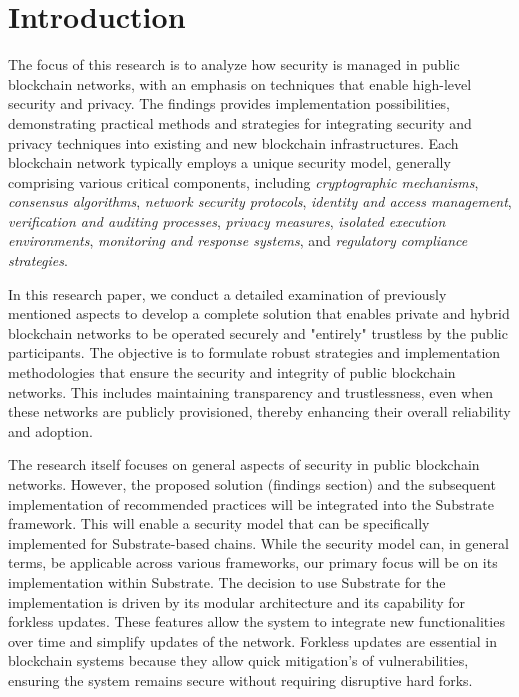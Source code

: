\section{Introduction}
The focus of this research is to analyze how security is managed in public blockchain networks, with an emphasis on techniques that enable high-level security and privacy. The findings provides implementation possibilities, demonstrating practical methods and strategies for integrating security and privacy techniques into existing and new blockchain infrastructures. Each blockchain network typically employs a unique security model, generally comprising various critical components, including \textit{cryptographic mechanisms}, \textit{consensus algorithms}, \textit{network security protocols}, \textit{identity and access management}, \textit{verification and auditing processes}, \textit{privacy measures}, \textit{isolated execution environments}, \textit{monitoring and response systems}, and \textit{regulatory compliance strategies}.

In this research paper, we conduct a detailed examination of previously mentioned aspects to develop a complete solution that enables private and hybrid blockchain networks to be operated securely and "entirely" trustless by the public participants. The objective is to formulate robust strategies and implementation methodologies that ensure the security and integrity of public blockchain networks. This includes maintaining transparency and trustlessness, even when these networks are publicly provisioned, thereby enhancing their overall reliability and adoption.

The research itself focuses on general aspects of security in public blockchain networks. However, the proposed solution (findings section) and the subsequent implementation of recommended practices will be integrated into the Substrate framework. This will enable a security model that can be specifically implemented for Substrate-based chains. While the security model can, in general terms, be applicable across various frameworks, our primary focus will be on its implementation within Substrate. The decision to use Substrate for the implementation is driven by its modular architecture and its capability for forkless updates. These features allow the system to integrate new functionalities over time and simplify updates of the network. Forkless updates are essential in blockchain systems because they allow quick mitigation's of vulnerabilities, ensuring the system remains secure without requiring disruptive hard forks. 


